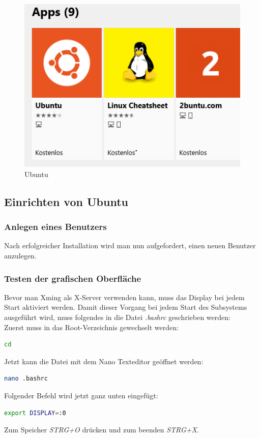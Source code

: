 \begin{figure}[H]
\centering
\includegraphics[scale=0.8]{Bilder/Ubuntu.PNG}
\caption{Ubuntu}
\label{fig:Ubuntu}
\end{figure}

\subsection{Einrichten von Ubuntu}
\subsubsection{Anlegen eines Benutzers}
Nach erfolgreicher Installation wird man nun aufgefordert, einen neuen Benutzer anzulegen.

\subsubsection{Testen der grafischen Oberfläche}
Bevor man Xming als X-Server verwenden kann, muss das Display bei jedem Start aktiviert werden. Damit dieser Vorgang bei jedem Start des Subsystems ausgeführt wird, muss folgendes in die Datei \textit{.bashrc} geschrieben werden:\\
Zuerst muss in das Root-Verzeichnis gewechselt werden:
\begin{lstlisting}[language=bash]
cd
\end{lstlisting}

Jetzt kann die Datei mit dem Nano Texteditor geöffnet werden:
\begin{lstlisting}[language=bash]
nano .bashrc
\end{lstlisting}

Folgender Befehl wird jetzt ganz unten eingefügt:
\begin{lstlisting}[language=bash]
export DISPLAY=:0
\end{lstlisting}
Zum Speicher \textit{STRG+O} drücken und zum beenden \textit{STRG+X}.

